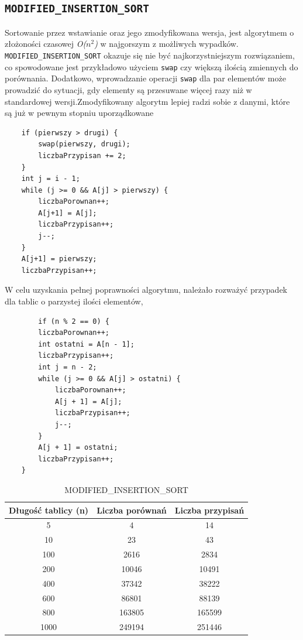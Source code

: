 \documentclass{article}
\begin{document}
\subsection{\texttt{MODIFIED\_INSERTION\_SORT}}
Sortowanie przez wstawianie oraz jego zmodyfikowana wersja, jest algorytmem o złożoności czasowej \emph{O($n^2$)} w najgorszym z możliwych wypadków. 
\\ \texttt{MODIFIED\_INSERTION\_SORT} okazuje się nie być najkorzystniejszym rozwiązaniem, co spowodowane jest przykładowo użyciem \texttt{swap} czy większą ilością zmiennych do porównania. Dodatkowo, wprowadzanie operacji \texttt{swap} dla par elementów może prowadzić do  sytuacji, gdy elementy są przesuwane więcej razy niż w standardowej wersji.Zmodyfikowany algorytm lepiej radzi sobie z danymi, które są już w pewnym stopniu uporządkowane
\begin{lstlisting}
	if (pierwszy > drugi) {
		swap(pierwszy, drugi); 
		liczbaPrzypisan += 2;  
	}
	int j = i - 1;
	while (j >= 0 && A[j] > pierwszy) {
		liczbaPorownan++;
		A[j+1] = A[j];
		liczbaPrzypisan++;
		j--;
	}
	A[j+1] = pierwszy;
	liczbaPrzypisan++;
\end{lstlisting}
W celu uzyskania pełnej poprawności algorytmu, należało rozważyć przypadek dla tablic o parzystej ilości elementów,
\begin{lstlisting}
	    if (n % 2 == 0) {
		liczbaPorownan++;
		int ostatni = A[n - 1];
		liczbaPrzypisan++;
		int j = n - 2;
		while (j >= 0 && A[j] > ostatni) {
			liczbaPorownan++;
			A[j + 1] = A[j];
			liczbaPrzypisan++;
			j--;
		}
		A[j + 1] = ostatni;
		liczbaPrzypisan++;
	}
\end{lstlisting}
\begin{table}[h!]
	\centering
	\small 
	\begin{tabular}{|c|c|c|}
		\hline
		\textbf{Długość tablicy (n)} & \textbf{Liczba porównań} & \textbf{Liczba przypisań} \\ \hline
		5   & 4     & 14     \\ \hline
		10  & 23    & 43     \\ \hline
		100 & 2616  & 2834   \\ \hline
		200 & 10046 & 10491  \\ \hline
		400 & 37342 & 38222  \\ \hline
		600 & 86801 & 88139  \\ \hline
		800 & 163805 & 165599 \\ \hline
		1000 & 249194 & 251446 \\ \hline
	\end{tabular}
	\caption{MODIFIED\_INSERTION\_SORT}
\end{table}
\end{document}
